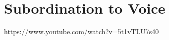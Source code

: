 %
%
%
%
%
%

\section{Subordination to Voice}
\begin{orangebox}
	https://www.youtube.com/watch?v=5t1vTLU7s40
\end{orangebox}


